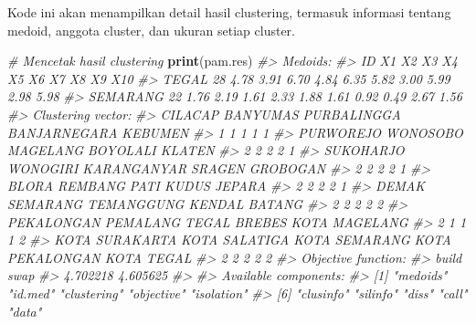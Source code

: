 \documentclass[
  oneside]{book}
\newenvironment{Shaded}{\begin{snugshade}}{\end{snugshade}}
\newcommand{\CommentTok}[1]{\textcolor[rgb]{0.56,0.35,0.01}{\textit{#1}}}
\newcommand{\FunctionTok}[1]{\textcolor[rgb]{0.13,0.29,0.53}{\textbf{#1}}}
\newcommand{\NormalTok}[1]{#1}
\begin{document}
Kode ini akan menampilkan detail hasil clustering, termasuk informasi tentang medoid, anggota cluster, dan ukuran setiap cluster.

\begin{Shaded}
\begin{Highlighting}[]
\CommentTok{\# Mencetak hasil clustering}
\FunctionTok{print}\NormalTok{(pam.res)}
\CommentTok{\#\textgreater{} Medoids:}
\CommentTok{\#\textgreater{}          ID   X1   X2   X3   X4   X5   X6   X7   X8   X9  X10}
\CommentTok{\#\textgreater{} TEGAL    28 4.78 3.91 6.70 4.84 6.35 5.82 3.00 5.99 2.98 5.98}
\CommentTok{\#\textgreater{} SEMARANG 22 1.76 2.19 1.61 2.33 1.88 1.61 0.92 0.49 2.67 1.56}
\CommentTok{\#\textgreater{} Clustering vector:}
\CommentTok{\#\textgreater{}         CILACAP        BANYUMAS     PURBALINGGA    BANJARNEGARA         KEBUMEN }
\CommentTok{\#\textgreater{}               1               1               1               1               1 }
\CommentTok{\#\textgreater{}       PURWOREJO        WONOSOBO        MAGELANG        BOYOLALI          KLATEN }
\CommentTok{\#\textgreater{}               2               2               2               2               1 }
\CommentTok{\#\textgreater{}       SUKOHARJO        WONOGIRI     KARANGANYAR          SRAGEN        GROBOGAN }
\CommentTok{\#\textgreater{}               2               2               2               2               1 }
\CommentTok{\#\textgreater{}           BLORA         REMBANG            PATI           KUDUS          JEPARA }
\CommentTok{\#\textgreater{}               2               2               2               2               1 }
\CommentTok{\#\textgreater{}         DEMAK          SEMARANG      TEMANGGUNG          KENDAL          BATANG }
\CommentTok{\#\textgreater{}               2               2               2               2               2 }
\CommentTok{\#\textgreater{}      PEKALONGAN        PEMALANG           TEGAL          BREBES   KOTA MAGELANG }
\CommentTok{\#\textgreater{}               2               1               1               1               2 }
\CommentTok{\#\textgreater{}  KOTA SURAKARTA   KOTA SALATIGA   KOTA SEMARANG KOTA PEKALONGAN      KOTA TEGAL }
\CommentTok{\#\textgreater{}               2               2               2               2               2 }
\CommentTok{\#\textgreater{} Objective function:}
\CommentTok{\#\textgreater{}    build     swap }
\CommentTok{\#\textgreater{} 4.702218 4.605625 }
\CommentTok{\#\textgreater{} }
\CommentTok{\#\textgreater{} Available components:}
\CommentTok{\#\textgreater{}  [1] "medoids"    "id.med"     "clustering" "objective"  "isolation" }
\CommentTok{\#\textgreater{}  [6] "clusinfo"   "silinfo"    "diss"       "call"       "data"}
\end{Highlighting}
\end{Shaded}
\end{document}
